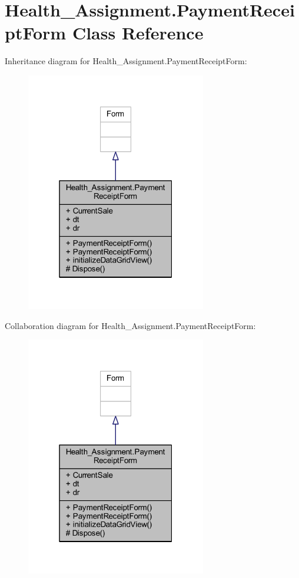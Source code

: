 \hypertarget{class_health___assignment_1_1_payment_receipt_form}{}\section{Health\+\_\+\+Assignment.\+Payment\+Receipt\+Form Class Reference}
\label{class_health___assignment_1_1_payment_receipt_form}


Inheritance diagram for Health\+\_\+\+Assignment.\+Payment\+Receipt\+Form\+:\nopagebreak
\begin{figure}[H]
\begin{center}
\leavevmode
\includegraphics[width=223pt]{class_health___assignment_1_1_payment_receipt_form__inherit__graph}
\end{center}
\end{figure}


Collaboration diagram for Health\+\_\+\+Assignment.\+Payment\+Receipt\+Form\+:\nopagebreak
\begin{figure}[H]
\begin{center}
\leavevmode
\includegraphics[width=223pt]{class_health___assignment_1_1_payment_receipt_form__coll__graph}
\end{center}
\end{figure}
